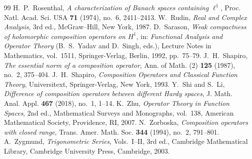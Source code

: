 \documentclass[10pt,a4paper]{amsart}
\begin{document}
\begin{thebibliography}{99}
 H.~P.~Rosenthal, \textit{A characterization of Banach spaces containing \(\ell^1\)}, Proc. Natl. Acad. Sci. USA \textbf{71} (1974), no.~6, 2411--2413.
 W.~Rudin, \textit{Real and Complex Analysis}, 3rd ed., McGraw--Hill, New York, 1987.
 D.~Sarason, \textit{Weak compactness of holomorphic composition operators on \(H^1\)}, in: \textit{Functional Analysis and Operator Theory} (B.~S.~Yadav and D.~Singh, eds.), Lecture Notes in Mathematics, vol.~1511, Springer-Verlag, Berlin, 1992, pp.~75--79.
 J.~H.~Shapiro, \textit{The essential norm of a composition operator}, Ann. of Math. (2) \textbf{125} (1987), no.~2, 375--404.
 J.~H.~Shapiro, \textit{Composition Operators and Classical Function Theory}, Universitext, Springer-Verlag, New York, 1993.
 Y.~Shi and S.~Li, \textit{Difference of composition operators between different Hardy spaces}, J. Math. Anal. Appl. \textbf{467} (2018), no.~1, 1--14.
 K.~Zhu, \textit{Operator Theory in Function Spaces}, 2nd ed., Mathematical Surveys and Monographs, vol.~138, American Mathematical Society, Providence, RI, 2007.
 N.~Zorboska, \textit{Composition operators with closed range}, Trans. Amer. Math. Soc. \textbf{344} (1994), no.~2, 791--801.
 A.~Zygmund, \textit{Trigonometric Series}, Vols.~I--II, 3rd ed., Cambridge Mathematical Library, Cambridge University Press, Cambridge, 2003.
\end{thebibliography}
\end{document}
